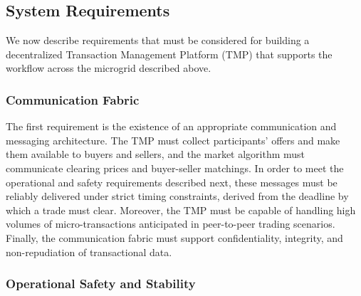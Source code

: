 

\subsection{System Requirements}
\label{sec:requirements}

We now describe  requirements that  must be considered for building a decentralized Transaction Management Platform (TMP) that supports the workflow across the microgrid described above.

\subsubsection{Communication Fabric}

The first requirement is the existence of an appropriate communication and messaging architecture. The TMP must collect participants' offers and make them available to buyers and sellers, and the market algorithm must communicate clearing prices and buyer-seller matchings.
In order to meet the operational and safety requirements described next, these messages must be reliably delivered under strict timing constraints, derived from the deadline by which a trade must clear. Moreover, the TMP must be capable of handling high volumes of micro-transactions anticipated in peer-to-peer trading scenarios.  Finally, the communication fabric must support confidentiality, integrity, and non-repudiation of transactional data.




\subsubsection{Operational Safety and Stability}

